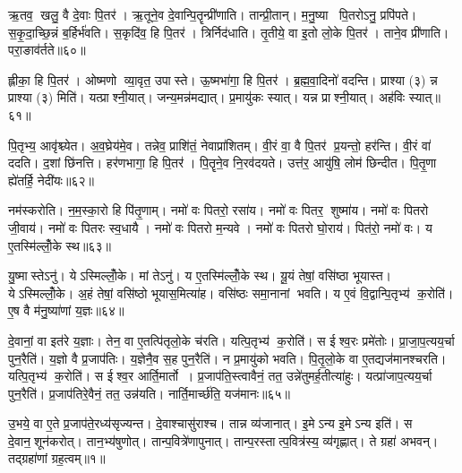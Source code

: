 ऋ॒तव॒ खलु॒ वै दे॒वाः पि॒तर॑। ऋ॒तूने॒व दे॒वान्पि॒तॄन्प्री॑णाति। तान्प्री॒तान्। म॒नु॒ष्या पि॒तरोऽनु॒ प्रपि॑पते। स॒कृ॒दा॒च्छि॒न्नं ब॒र्\mbox{}हिर्भ॑वति। स॒कृदि॑व॒ हि पि॒तर॑। त्रिर्निद॑धाति। तृ॒तीये॒ वा इ॒तो लो॒के पि॒तर॑। ताने॒व प्री॑णाति। परा॒ङाव॑र्तते॥६०॥

ह्लीका॒ हि पि॒तर॑। ओष्मणो व्या॒वृत॒ उपास्ते। ऊ॒ष्मभा॑गा॒ हि पि॒तर॑। ब्र॒ह्म॒वा॒दिनो॑ वदन्ति। प्राश्या (३) न्न प्राश्या (३) मिति॑। यत्प्राश्नी॒यात्। जन्य॒मन्न॑मद्यात्। प्र॒मायु॑कः स्यात्। यन्न प्राश्नी॒यात्। अह॑विः स्यात्॥६१॥

पि॒तृभ्य॒ आवृ॑श्च्येत। अ॒व॒घ्रेय॑मे॒व। तन्नेव॒ प्राशि॑तं॒ नेवाप्रा॑शितम्। वी॒रं वा॒ वै पि॒तर॑ प्र॒यन्तो॒ हर॑न्ति। वी॒रं वा॑ ददति। द॒शां छि॑नत्ति। हर॑णभागा॒ हि पि॒तर॑। पि॒तॄने॒व नि॒रव॑दयते। उत्त॑र॒ आयु॑षि॒ लोम॑ छिन्दीत। पि॒तृ॒णा ह्ये॑तर्\mbox{}हि॒ नेदी॑यः॥६२॥

नम॑स्करोति। न॒म॒स्का॒रो हि पि॑तृ॒णाम्। नमो॑ वः पितरो॒ रसा॑य। नमो॑ वः पितर॒ शुष्मा॑य। नमो॑ वः पितरो जी॒वाय॑। नमो॑ वः पितरः स्व॒धायै। नमो॑ वः पितरो म॒न्यवे। नमो॑ वः पितरो घो॒राय॑। पित॑रो॒ नमो॑ वः। य ए॒तस्मि॑ल्लोँ॒के स्थ॥६३॥

यु॒ष्मास्तेऽनु॑। येऽस्मिल्लोँ॒के। मां तेऽनु॑। य ए॒तस्मि॑ल्लोँ॒के स्थ। यू॒यं तेषां॒ वसि॑ष्ठा भूयास्त। येऽस्मिल्लोँ॒के। अ॒हं तेषां॒ वसि॑ष्ठो भूयास॒मित्या॑ह। वसि॑ष्ठः समा॒नानां भवति। य ए॒वं वि॒द्वान्पि॒तृभ्य॑ क॒रोति॑। ए॒ष वै म॑नु॒ष्या॑णां य॒ज्ञः॥६४॥

दे॒वानां॒ वा इत॑रे य॒ज्ञाः। तेन॒ वा ए॒तत्पि॑तृलो॒के च॑रति। यत्पि॒तृभ्य॑ क॒रोति॑। स ईश्व॒रः प्रमे॑तोः। प्रा॒जा॒प॒त्यय॒र्चा पुन॒रैति॑। य॒ज्ञो वै प्र॒जाप॑तिः। य॒ज्ञेनै॒व स॒ह पुन॒रैति॑। न प्र॒मायु॑को भवति। पि॒तृ॒लो॒के वा ए॒तद्यज॑मानश्चरति। यत्पि॒तृभ्य॑ क॒रोति॑। स ईश्व॒र आर्ति॒मार्तो। प्र॒जाप॑ति॒स्त्वावैनं॒ तत॒ उन्ने॑तुमर्\mbox{}ह॒तीत्या॑हुः। यत्प्रा॑जाप॒त्यय॒र्चा पुन॒रैति॑। प्र॒जाप॑तिरे॒वैनं॒ तत॒ उन्न॑यति। नार्ति॒मार्च्छ॑ति॒ यज॑मानः॥६५॥



\clearpage
{}
\setcounter{anuvakam}{0}
उ॒भये॒ वा ए॒ते प्र॒जाप॑ते॒रध्य॑सृज्यन्त। दे॒वाश्चासु॑राश्च। तान्न व्य॑जानात्। इ॒मेऽन्य इ॒मेऽन्य इति॑। स दे॒वान॒शून॑करोत्। तान॒भ्य॑षुणोत्। तान्प॒वित्रे॑णापुनात्। तान्प॒रस्तात्प॒वित्र॑स्य॒ व्य॑गृह्णात्। ते ग्रहा॑ अभवन्। तद्ग्रहा॑णां ग्रह॒त्वम्॥१॥

